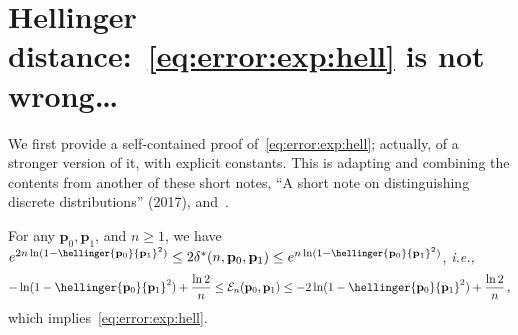 \documentclass[10pt]{article}
\newcommand{\p}{\mathbf{p}}
\newcommand{\errproba}{\delta}
\newcommand{\ns}{n}
\newcommand{\errexp}{\mathcal{E}}
\begin{document}
\section{Hellinger distance:~\eqref{eq:error:exp:hell} is not wrong\dots}
We first provide a self-contained proof of~\eqref{eq:error:exp:hell}; actually, of a stronger version of it, with explicit constants. This is adapting and combining the contents from another of these short notes, ``A short note on distinguishing discrete distributions'' (2017), and~\cite[Theorem 4.7]{BarYossef:02}.
\begin{lemma}
	\label{lemma:errexponent:hell}
For any $\p_0,\p_1$, and $\ns \geq 1$, we have
$
	e^{2\ns\ln(1-\hellinger{\p_0}{\p_1}^2)} \leq 2\errproba^\ast(\ns,\p_0,\p_1) \leq e^{\ns\ln(1-\hellinger{\p_0}{\p_1}^2)}
$, 
\emph{i.e.,}
\begin{equation}
			-\ln(1-\hellinger{\p_0}{\p_1}^2) + \frac{\ln 2}{\ns} \leq \errexp_\ns(\p_0,\p_1)  \leq -2\ln(1-\hellinger{\p_0}{\p_1}^2) + \frac{\ln 2}{\ns}\,,
\end{equation}
which implies~\eqref{eq:error:exp:hell}.
\end{lemma}
\end{document}
